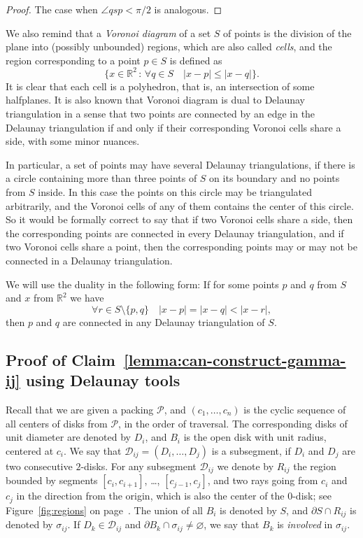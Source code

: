 \begin{appendices}
\begin{proof}
The case when $\angle{qsp} < \pi/2$ is analogous.
\end{proof}

We also remind that a \emph{Voronoi diagram} of a set $S$ of points is the division of the plane into (possibly unbounded) regions, which are also called \emph{cells}, and the region corresponding to a point $p\in S$ is defined as
$$\{x\in\mathbb{R}^2\,\colon\,\forall q\in S\quad |x - p|\leq |x - q|\}.$$
It is clear that each cell is a polyhedron, that is, an intersection of some halfplanes. It is also known that Voronoi diagram is dual to Delaunay triangulation in a sense that two points are connected by an edge in the Delaunay triangulation if and only if their corresponding Voronoi cells share a side, with some minor nuances.

In particular, a set of points may have several Delaunay triangulations, if there is a circle containing more than three points of $S$ on its boundary and no points from $S$ inside. In this case the points on this circle may be triangulated arbitrarily, and the Voronoi cells of any of them contains the center of this circle. So it would be formally correct to say that if two Voronoi cells share a side, then the corresponding points are connected in every Delaunay triangulation, and if two Voronoi cells share a point, then the corresponding points may or may not be connected in a Delaunay triangulation.

We will use the duality in the following form: If for some points $p$ and $q$ from $S$ and $x$ from $\mathbb{R}^2$ we have
$$\forall r\in S\setminus\{p, q\}\quad |x - p| = |x - q| < |x - r|,$$
then $p$ and $q$ are connected in any Delaunay triangulation of $S$.

\subsection{Proof of Claim~\ref{lemma:can-construct-gamma-ij} using Delaunay tools}

Recall that we are given a packing $\mathcal{P}$, and $(c_1, \ldots, c_n)$ is the cyclic sequence of all centers of disks from $\mathcal{P}$, in the order of traversal. The corresponding disks of unit diameter are denoted by $D_i$, and $B_i$ is the open disk with unit radius, centered at $c_i$. We say that $\mathcal{D}_{ij} = (D_i, \ldots, D_j)$ is a subsegment, if $D_i$ and $D_j$ are two consecutive $2$-disks. For any subsegment $\mathcal{D}_{ij}$ we denote by $R_{ij}$ the region bounded by segments $[c_i, c_{i+1}]$, \ldots, $[c_{j-1}, c_j]$, and two rays going from $c_i$ and $c_j$ in the direction from the origin, which is also the center of the $0$-disk; see Figure~\ref{fig:regions} on page~\pageref{fig:division-into-regions}. The union of all $B_i$ is denoted by $S$, and $\partial{S}\cap R_{ij}$ is denoted by $\sigma_{ij}$. If $D_k\in\mathcal{D}_{ij}$ and $\partial{B_k}\cap\sigma_{ij}\neq\varnothing$, we say that $B_k$ is \emph{involved} in $\sigma_{ij}$.


\end{appendices}
